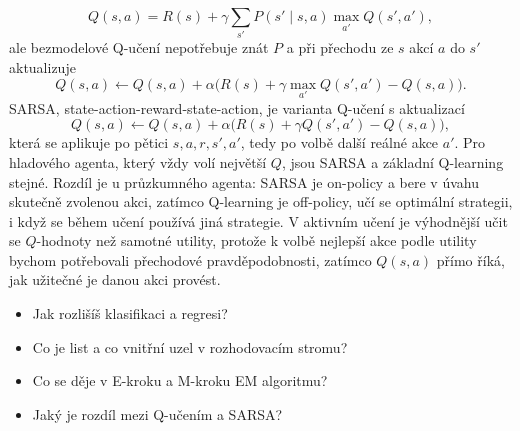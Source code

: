 \begin{odpoved}
\[
Q(s,a)=R(s)+\gamma\sum_{s'}P(s'\mid s,a)\max_{a'}Q(s',a'),
\]
ale bezmodelové Q-učení nepotřebuje znát $P$ a při přechodu ze $s$ akcí $a$ do $s'$ aktualizuje
\[
Q(s,a)\leftarrow Q(s,a)+\alpha\bigl(R(s)+\gamma\max_{a'}Q(s',a')-Q(s,a)\bigr).
\]
SARSA, state-action-reward-state-action, je varianta Q-učení s aktualizací
\[
Q(s,a)\leftarrow Q(s,a)+\alpha\bigl(R(s)+\gamma Q(s',a')-Q(s,a)\bigr),
\]
která se aplikuje po pětici $s,a,r,s',a'$, tedy po volbě další reálné akce $a'$. Pro hladového agenta, který vždy volí největší $Q$, jsou SARSA a základní Q-learning stejné. Rozdíl je u průzkumného agenta: SARSA je on-policy a bere v úvahu skutečně zvolenou akci, zatímco Q-learning je off-policy, učí se optimální strategii, i když se během učení používá jiná strategie. V aktivním učení je výhodnější učit se $Q$-hodnoty než samotné utility, protože k volbě nejlepší akce podle utility bychom potřebovali přechodové pravděpodobnosti, zatímco $Q(s,a)$ přímo říká, jak užitečné je danou akci provést.
\end{odpoved}

\begin{recall}
\begin{itemize}[leftmargin=1.2em,itemsep=0pt,topsep=1pt]
  \item Jak rozlišíš klasifikaci a regresi?
  \item Co je list a co vnitřní uzel v rozhodovacím stromu?
  \item Co se děje v E-kroku a M-kroku EM algoritmu?
  \item Jaký je rozdíl mezi Q-učením a SARSA?
\end{itemize}
\end{recall}
